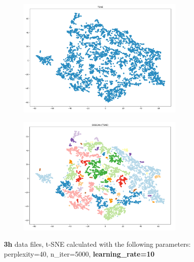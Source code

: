 \begin{figure}[H]
	\centering
	
  \centering
	\begin{subfigure}{.5\textwidth}
    \centering
    \includegraphics[width=0.9\textwidth]{./images/tsneParametersTest/learningRate/lr10-3hTSNE.png}
  \end{subfigure}%
  \begin{subfigure}{.5\textwidth}
    \centering
    \includegraphics[width=0.9\textwidth]{./images/tsneParametersTest/learningRate/lr10-3hDBSCAN.png}
	\end{subfigure}
	\caption{\textbf{3h} data files, t-SNE calculated with the following parameters: perplexity=40, n\_iter=5000, \textbf{learning\_rate=10}}
  \label{figure:3hlr10TSNE}
\end{figure}

